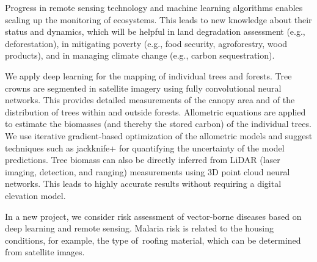 \documentclass[a4paper,UKenglish]{dagrep-v2018}
\begin{document}
\license
{}

Progress in remote sensing technology and machine learning algorithms enables scaling up the monitoring of ecosystems. This leads to new knowledge about their status and dynamics, which will be helpful in land degradation assessment (e.g., deforestation), in mitigating poverty (e.g., food security, agroforestry, wood products), and in managing climate change (e.g., carbon sequestration).

We apply deep learning for the mapping of individual trees and forests. Tree crowns are segmented in satellite imagery using fully convolutional neural networks. This provides detailed measurements of the canopy area and of the distribution of trees within and outside forests. Allometric equations are applied to estimate the biomasses (and thereby the stored carbon) of the individual trees. We use iterative gradient-based optimization of the allometric models and suggest techniques such as  jackknife+ for quantifying the uncertainty of the model predictions. Tree biomass can also be directly inferred from LiDAR (laser imaging, detection, and ranging) measurements using 3D point cloud neural networks. This leads to highly accurate results without requiring a digital elevation model. 

In a new project, we consider risk assessment of vector-borne diseases based on deep learning and remote sensing. Malaria risk is related to the housing conditions, for example, the type of roofing material, which can be determined from satellite images.

\license
\end{document}

